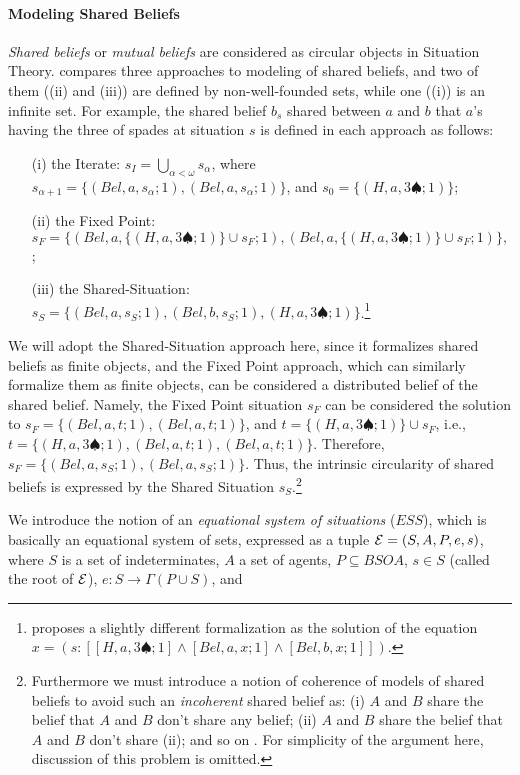 \paragraph{Modeling Shared Beliefs}
{\it Shared beliefs} or {\it mutual beliefs} are considered as circular objects in Situation Theory.
\cite{Bar89} compares three approaches to modeling of shared beliefs, and two of them ((ii) and (iii)) are defined by non-well-founded sets, while one ((i)) is an infinite set.
For example, the shared belief $b_s$ shared between $a$ and $b$ that $a$'s having the three of spades at situation $s$ is defined in each approach as follows:
\begin{itemize}
\item [(i)] the Iterate: 
$s_I=\bigcup_{\alpha<\omega}s_{\alpha}$, where $s_{\alpha+1}=\{(Bel,a,s_{\alpha};1),(Bel,a,s_{\alpha};1)\}$, and $s_0=\{(H,a,3\spadesuit;1)\}$;
\item [(ii)] the Fixed Point: 
$s_F=\{(Bel,a,\{(H,a,3\spadesuit;1)\}\cup s_F;1),(Bel,a,\{(H,a,3\spadesuit;1)\}\cup s_F;1)\},$;
\item [(iii)] the Shared-Situation: $s_S=\{(Bel,a,s_S;1),(Bel,b,s_S;1),(H,a,3\spadesuit;1)\}$.\<\footnote{
\cite{BE87} proposes a slightly different formalization as the solution of the equation $x=(s:[[H,a,3\spadesuit;1]\wedge [Bel,a,x;1]\wedge [Bel,b,x;1]]).$
}
\end{itemize}
We will adopt the Shared-Situation approach here, 
since it formalizes shared beliefs as finite objects, and the Fixed Point approach, which can similarly formalize them as finite objects,
can be considered a distributed belief of the shared belief.
Namely, the Fixed Point situation $s_F$ can be considered the solution to $s_F=\{(Bel,a,t;1),(Bel,a,t;1)\}$, and $t=\{(H,a,3\spadesuit;1)\}\cup s_F$, i.e., 
$t=\{(H,a,3\spadesuit;1),(Bel,a,t;1),(Bel,a,t;1)\}$.
Therefore, $s_F=\{(Bel,a,s_S;1),(Bel,a,s_S;1)\}$.
Thus, the intrinsic circularity of shared beliefs is expressed by the Shared Situation $s_S$.\<\footnote{
Furthermore we must introduce a notion of coherence of models of shared beliefs to avoid such an {\it incoherent} shared belief as: (i) $A$ and $B$ share the belief that $A$ and $B$ don't share any belief; (ii) $A$ and $B$ share the belief that $A$ and $B$ don't share (ii); and so on \cite{Oga95c}.
For simplicity of the argument here, discussion of this problem is omitted.}
\par
We introduce the notion of an {\it equational system of situations} ($ESS$), 
which is basically an equational system of sets, expressed as a tuple ${\cal E}=(S,A,P,e,s)$, where $S$ is a set of indeterminates, $A$ a set of agents, $P\subseteq BSOA$, $s\in S$ (called the root of ${\cal E}$), $e:S\to \Gamma(P\cup S)$, and 
